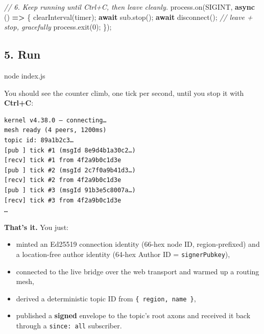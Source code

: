 \documentclass[
  nobib]{tufte-handout}
\newenvironment{Shaded}{}{}
\newcommand{\BuiltInTok}[1]{\textcolor[rgb]{0.00,0.50,0.00}{#1}}
\newcommand{\CommentTok}[1]{\textcolor[rgb]{0.38,0.63,0.69}{\textit{#1}}}
\newcommand{\ControlFlowTok}[1]{\textcolor[rgb]{0.00,0.44,0.13}{\textbf{#1}}}
\newcommand{\DecValTok}[1]{\textcolor[rgb]{0.25,0.63,0.44}{#1}}
\newcommand{\ExtensionTok}[1]{#1}
\newcommand{\FunctionTok}[1]{\textcolor[rgb]{0.02,0.16,0.49}{#1}}
\newcommand{\KeywordTok}[1]{\textcolor[rgb]{0.00,0.44,0.13}{\textbf{#1}}}
\newcommand{\NormalTok}[1]{#1}
\newcommand{\OperatorTok}[1]{\textcolor[rgb]{0.40,0.40,0.40}{#1}}
\newcommand{\PreprocessorTok}[1]{\textcolor[rgb]{0.74,0.48,0.00}{#1}}
\newcommand{\StringTok}[1]{\textcolor[rgb]{0.25,0.44,0.63}{#1}}
\providecommand{\tightlist}{%
  \setlength{\itemsep}{0pt}\setlength{\parskip}{0pt}}
\begin{document}
\begin{Shaded}
\begin{Highlighting}[]
\CommentTok{// 6. Keep running until Ctrl+C, then leave cleanly.}
\BuiltInTok{process}\OperatorTok{.}\FunctionTok{on}\NormalTok{(}\StringTok{\textquotesingle{}SIGINT\textquotesingle{}}\OperatorTok{,} \KeywordTok{async}\NormalTok{ () }\KeywordTok{=\textgreater{}}\NormalTok{ \{}
  \PreprocessorTok{clearInterval}\NormalTok{(timer)}\OperatorTok{;}
  \ControlFlowTok{await}\NormalTok{ sub}\OperatorTok{.}\FunctionTok{stop}\NormalTok{()}\OperatorTok{;}
  \ControlFlowTok{await} \FunctionTok{disconnect}\NormalTok{()}\OperatorTok{;}          \CommentTok{// leave + stop, gracefully}
  \BuiltInTok{process}\OperatorTok{.}\FunctionTok{exit}\NormalTok{(}\DecValTok{0}\NormalTok{)}\OperatorTok{;}
\NormalTok{\})}\OperatorTok{;}
\end{Highlighting}
\end{Shaded}

\subsection{5. Run}\label{run}

\begin{Shaded}
\begin{Highlighting}[]
\ExtensionTok{node}\NormalTok{ index.js}
\end{Highlighting}
\end{Shaded}

You should see the counter climb, one tick per second, until you stop it
with \textbf{Ctrl+C}:

\begin{verbatim}
kernel v4.38.0 — connecting…
mesh ready (4 peers, 1200ms)
topic id: 89a1b2c3…
[pub ] tick #1 (msgId 8e9d4b1a30c2…)
[recv] tick #1 from 4f2a9b0c1d3e
[pub ] tick #2 (msgId 2c7f0a9b41d3…)
[recv] tick #2 from 4f2a9b0c1d3e
[pub ] tick #3 (msgId 91b3e5c8007a…)
[recv] tick #3 from 4f2a9b0c1d3e
…
\end{verbatim}

\textbf{That's it.} You just:

\begin{itemize}
\tightlist
\item
  minted an Ed25519 connection identity (66-hex node ID,
  region-prefixed) and a location-free author identity (64-hex Author ID
  = \texttt{signerPubkey}),
\item
  connected to the live bridge over the web transport and warmed up a
  routing mesh,
\item
  derived a deterministic topic ID from \texttt{\{\ region,\ name\ \}},
\item
  published a \textbf{signed} envelope to the topic's root axons and
  received it back through a
  \texttt{since:\ \textquotesingle{}all\textquotesingle{}} subscriber.
\end{itemize}
\end{document}

